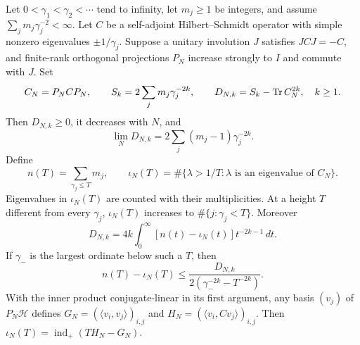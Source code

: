 \begin{proposition}
\label{prop:moment-inertia}
Let $0<\gamma_1<\gamma_2<\cdots$ tend to infinity, let $m_j\geq1$
be integers, and assume $\sum_jm_j\gamma_j^{-2}<\infty$.
Let $C$ be a self-adjoint Hilbert--Schmidt operator with simple
nonzero eigenvalues $\pm1/\gamma_j$. Suppose a unitary involution $J$
satisfies $JCJ=-C$, and finite-rank orthogonal projections $P_N$
increase strongly to $I$ and commute with $J$. Set
\[
 C_N=P_NCP_N,\qquad
 S_k=2\sum_jm_j\gamma_j^{-2k},\qquad
 D_{N,k}=S_k-\operatorname{Tr} C_N^{2k},\quad k\geq1.
\]
Then $D_{N,k}\geq0$, it decreases with $N$, and
\begin{equation}\label{eq:moment-excess-limit}
 \lim_ND_{N,k}=2\sum_j(m_j-1)\gamma_j^{-2k}.
\end{equation}
Define
\[
 n(T)=\sum_{\gamma_j\leq T}m_j,
 \qquad \iota_N(T)=\#\{\lambda>1/T:
                  \lambda\text{ is an eigenvalue of }C_N\}.
\]
Eigenvalues in $\iota_N(T)$ are counted with their multiplicities.
At a height $T$ different from every $\gamma_j$,
$\iota_N(T)$ increases to $\#\{j:\gamma_j<T\}$. Moreover
\begin{equation}\label{eq:moment-inertia-integral}
 D_{N,k}=4k\int_0^\infty
                [n(t)-\iota_N(t)]t^{-2k-1}\,dt.
\end{equation}
If $\gamma_-$ is the largest ordinate below such a $T$, then
\begin{equation}\label{eq:moment-gap-deficit}
 n(T)-\iota_N(T)
    \leq\frac{D_{N,k}}
                  {2(\gamma_-^{-2k}-T^{-2k})}.
\end{equation}
With the inner product conjugate-linear in its first argument,
any basis $(v_j)$ of $P_N\mathcal H$ defines
$G_N=(\langle v_i,v_j\rangle)_{i,j}$ and
$H_N=(\langle v_i,Cv_j\rangle)_{i,j}$. Then
$\iota_N(T)=\operatorname{ind}_+(TH_N-G_N)$.
\end{proposition}

